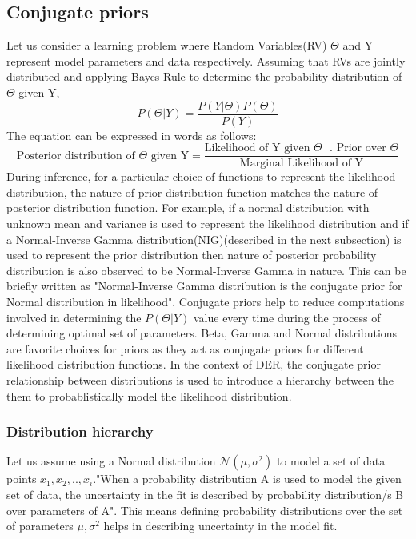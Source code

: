 	\subsection{Conjugate priors}
	Let us consider a learning problem where Random Variables(RV) $\Theta$ and Y represent model parameters and data respectively. Assuming that RVs are jointly distributed and applying Bayes Rule to determine the probability distribution of $\Theta$ given Y,
	\begin{equation*}
		P(\Theta|Y) = \frac{P(Y|\Theta)P(\Theta)}{P(Y)}
	\end{equation*}
	The equation can be expressed in words as follows:
	\begin{equation*}
		\text{Posterior distribution of $\Theta$ given Y}=\frac{\text{Likelihood of Y given $\Theta$ }.\text{ Prior over $\Theta$}}{\text{Marginal Likelihood of Y}}
	\end{equation*}
	During inference, for a particular choice of functions to represent the likelihood distribution, the nature of prior distribution function matches the nature of posterior distribution function. For example, if a normal distribution with unknown mean and
	variance is used to represent the likelihood distribution and if a Normal-Inverse Gamma distribution(NIG)(described in the next subsection) is used to represent the prior distribution then nature of posterior probability distribution is also observed to be Normal-Inverse Gamma in nature. This can be briefly written as "Normal-Inverse Gamma distribution is the conjugate prior for Normal distribution in likelihood".
	Conjugate priors help to reduce computations involved in determining the $P(\Theta|Y )$ value every time during the process of determining optimal set of parameters. Beta, Gamma and Normal distributions are favorite choices for priors as they act as conjugate priors for different likelihood distribution functions. In the context of DER, the conjugate prior relationship between distributions is used to introduce a hierarchy between the them to probablistically model the likelihood distribution. 
	\subsubsection{Distribution hierarchy}
	Let us assume using a Normal distribution $\mathcal{N}(\mu,\sigma^2)$ to model a set of data points $x_1,x_2,..,x_i$."When a probability distribution A is used to model the given set of data, the uncertainty in the fit is described by probability distribution/s B over parameters of A". This means defining probability distributions over the set of parameters $\mu,\sigma^2$ helps in describing uncertainty in the model fit.
	 

